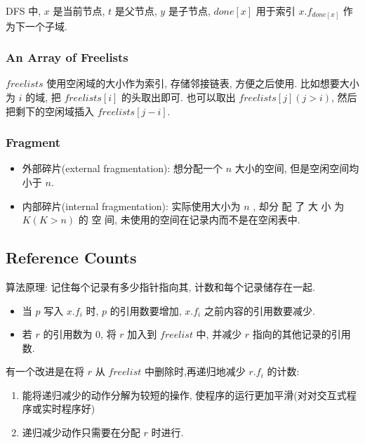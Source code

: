 DFS 中, $x$ 是当前节点, $t$ 是父节点, $y$ 是子节点, $done[x]$ 用于索引 $x.f_{done[x]}$ 作为下一个子域. 


\subsubsection{An Array of Freelists} 
$freelists$ 使用空闲域的大小作为索引, 存储邻接链表, 方便之后使用. 比如想要大小为 $i$ 的域, 把 $freelists[i]$ 的头取出即可. 也可以取出 $freelists[j](j>i)$, 然后把剩下的空闲域插入 $freelists[j-i]$.

\subsubsection{Fragment}
\begin{itemize}
    \item 外部碎片(external fragmentation): 想分配一个 $n$ 大小的空间, 但是空闲空间均小于 $n$.
    \item 内部碎片(internal fragmentation): 实际使用大小为 $n$ , 却分 配 了 大 小 为 $K(K>n)$ 的 空 间, 未使用的空间在记录内而不是在空闲表中.
\end{itemize}

\subsection{Reference Counts}
算法原理: 记住每个记录有多少指针指向其, 计数和每个记录储存在一起. 

\begin{itemize}
    \item 当 $p$ 写入 $x.f_i$ 时, $p$ 的引用数要增加, $x.f_i$ 之前内容的引用数要减少. 
    \item 若 $r$ 的引用数为 0, 将 $r$ 加入到 $freelist$ 中, 并减少 $r$ 指向的其他记录的引用数. 
\end{itemize}

有一个改进是在将 $r$ 从 $freelist$ 中删除时,再递归地减少 $r.f_i$ 的计数:
\begin{enumerate}
    \item 能将递归减少的动作分解为较短的操作, 使程序的运行更加平滑(对对交互式程序或实时程序好)
    \item 递归减少动作只需要在分配 $r$ 时进行. 
\end{enumerate}

